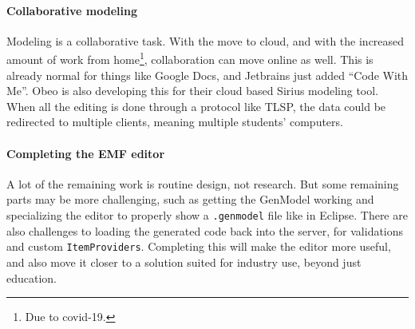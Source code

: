 \paragraph{Collaborative modeling}
Modeling is a collaborative task.
With the move to cloud, and with the increased amount of work from home\footnote{Due to covid-19.}, collaboration can move online as well.
This is already normal for things like Google Docs, and Jetbrains just added ``Code With Me''.
Obeo is also developing this for their cloud based Sirius modeling tool.
When all the editing is done through a protocol like \acrshort{TLSP}, the data could be redirected to multiple clients, meaning multiple students' computers.

\paragraph{Completing the EMF editor}
A lot of the remaining work is routine design, not research.
But some remaining parts may be more challenging, such as getting the GenModel working and specializing the editor to properly show a \texttt{.genmodel} file like in \gls{Eclipse}.
There are also challenges to loading the generated code back into the server, for validations and custom \texttt{ItemProviders}.
Completing this will make the editor more useful, and also move it closer to a solution suited for industry use, beyond just education.


